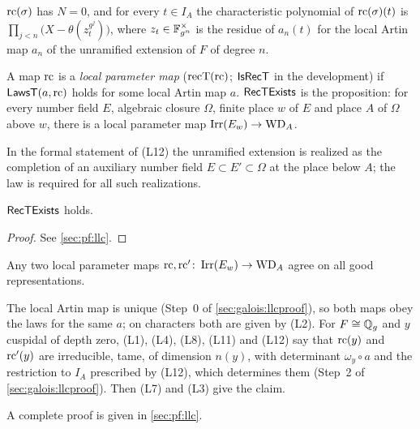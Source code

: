 \begin{definition}
\begin{enumerate}[label=(L\arabic*),leftmargin=3.2em,start=12,nosep]
  $\mathrm{rc}(\sigma)$ has $N=0$, and for every $t\in I_A$ the characteristic polynomial of
  $\mathrm{rc}(\sigma)(t)$ is $\prod_{j<n}\bigl(X-\theta(z_t^{g^j})\bigr)$, where $z_t\in\mathbb{F}_{g^n}^\times$ is
  the residue of $a_n(t)$ for the local Artin map $a_n$ of the unramified extension of $F$ of
  degree $n$.
\end{enumerate}
A map $\mathrm{rc}$ is a \emph{local parameter map} ($\mathrm{recT}(\mathrm{rc})$; $\mathsf{IsRecT}$ in the
development) if $\mathsf{LawsT}(a,\mathrm{rc})$ holds for some local Artin map $a$. $\mathsf{RecTExists}$
is the proposition: for every number field $E$, algebraic closure $\Omega$, finite place $w$ of $E$
and place $A$ of $\Omega$ above $w$, there is a local parameter map $\operatorname{Irr}(E_w)\to\mathrm{WD}_A$.
\end{definition}

In the formal statement of (L12) the unramified extension is realized as the completion of an
auxiliary number field $E\subset E'\subset\Omega$ at the place below $A$; the law is required for all
such realizations.

\begin{theorem}\Fmark\label{thm:rectexists}
$\mathsf{RecTExists}$ holds. 
\end{theorem}
\begin{proof}See \cref{sec:pf:llc}.
\end{proof}


\begin{proposition}\Fmark\label{prop:galois:unique}
Any two local parameter maps $\mathrm{rc},\mathrm{rc}'\colon\operatorname{Irr}(E_w)\to\mathrm{WD}_A$ agree on all
good representations. 
\end{proposition}

\begin{proofoutline}
The local Artin map is unique (Step~0 of \cref{sec:galois:llcproof}), so both maps obey the laws for
the same $a$; on characters both are given by (L2). For $F\cong\mathbb{Q}_g$ and $y$ cuspidal of depth zero,
(L1), (L4), (L8), (L11) and (L12) say that $\mathrm{rc}(y)$ and $\mathrm{rc}'(y)$ are irreducible, tame, of
dimension $n(y)$, with determinant $\omega_y\circ a$ and the restriction to $I_A$ prescribed by (L12),
which determines them (Step~2 of \cref{sec:galois:llcproof}). Then (L7) and (L3) give the claim.

A complete proof is given in \cref{sec:pf:llc}.
\end{proofoutline}

